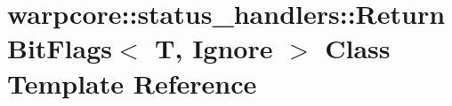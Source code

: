 \hypertarget{classwarpcore_1_1status__handlers_1_1ReturnBitFlags}{}\section{warpcore\+:\+:status\+\_\+handlers\+:\+:Return\+Bit\+Flags$<$ T, Ignore $>$ Class Template Reference}
\label{classwarpcore_1_1status__handlers_1_1ReturnBitFlags}
